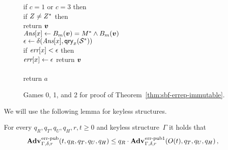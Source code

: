 \begin{figure*}
{{    if $c=1$ or $c=3$ then\\
    \tab if $Z \ne Z^*$  then\\
    \tab return $\v.v$\\
    \tab $\Ans[x] \gets \bmap_m(\v.v) = M^* \AND \bmap_m(\v.v)$\\
    \tab $\epsilon \gets \delta(\textit{Ans}[x],\mathsf{qry}_x(\mathcal{S}^*))$\\
    \tab if $\textit{err}[x] < \epsilon$ then\\
    \tab\tab $\textit{err}[x] \gets \epsilon$
    }
    return $\v.v$
}
{
  \vspace{-7pt}
  \
      \hfill {} \\[2pt]
    \\[2pt]
    return $a$
}
\caption{Games 0, 1, and 2 for proof of Theorem~\ref{thm:sbf-errep-immutable}.}
\label{fig:sbf-errep-immutable/games}
\end{figure*}

We will use the following lemma for keyless structures.

\begin{lemma}\label{thm:lemma1}
  For every $q_R, q_T, q_U, q_H, r, t \geq 0$ and keyless structure~$\Gamma$ it
  holds that
  \begin{eqnarray*}
    \begin{aligned}
      \Adv{\errep}_{\Gamma,\delta,r}(t,\,&q_R, q_T, q_U, q_H) \leq q_R \cdot \Adv{\errep1}_{\Gamma,\delta,r}(O(t), q_T, q_U, q_H) \,,
    \end{aligned}
  \end{eqnarray*}
\end{lemma}
%

